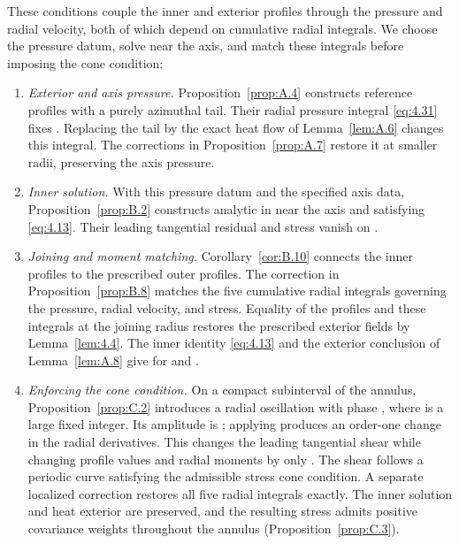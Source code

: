 These conditions couple the inner and exterior profiles through the pressure and radial velocity,
both of which depend on cumulative radial integrals. We choose the pressure datum, solve near the
axis, and match these integrals before imposing the cone condition:
\begin{enumerate}[label=\arabic*.]
 \item \emph{Exterior and axis pressure.} Proposition~\ref{prop:A.4} constructs reference profiles
 with a purely azimuthal tail. Their radial pressure integral \eqref{eq:4.31} fixes
 . Replacing the tail by the exact heat flow of
 Lemma~\ref{lem:A.6} changes this integral. The corrections in Proposition~\ref{prop:A.7} restore
 it at smaller radii, preserving the axis pressure.

 \item \emph{Inner solution.} With this pressure datum and the specified axis data,
 Proposition~\ref{prop:B.2} constructs  analytic in
  near the axis and satisfying \eqref{eq:4.13}. Their leading
 tangential residual and stress vanish on .

 \item \emph{Joining and moment matching.} Corollary~\ref{cor:B.10} connects the inner profiles to
 the prescribed outer profiles. The correction in Proposition~\ref{prop:B.8} matches the five
 cumulative radial integrals governing the pressure, radial velocity, and stress. Equality of the
 profiles and these integrals at the joining radius restores the prescribed exterior fields by
 Lemma~\ref{lem:4.4}. The inner identity \eqref{eq:4.13} and the exterior conclusion of
 Lemma~\ref{lem:A.8} give  for
  and .

 \item \emph{Enforcing the cone condition.} On a compact subinterval of the annulus,
 Proposition~\ref{prop:C.2} introduces a radial oscillation with phase
 , where  is a large fixed integer. Its
 amplitude is ; applying
  produces an order-one change in the radial derivatives. This
 changes the leading tangential shear while changing profile values and radial moments by only
 . The shear follows a periodic curve satisfying the admissible
 stress cone condition. A separate localized correction restores all five radial integrals
 exactly. The inner solution and heat exterior are preserved, and the resulting stress admits
 positive covariance weights throughout the annulus (Proposition~\ref{prop:C.3}).
\end{enumerate}

